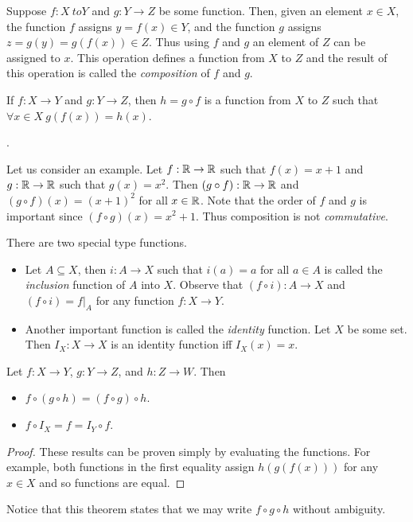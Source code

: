 Suppose $f : X \ to Y$ and $g : Y \to Z$ be some function. Then, given an
element $x \in X$, the function $f$ assigns $y = f(x) \in Y$, and the function
$g$ assigns $z = g(y) = g(f(x)) \in Z$. Thus using $f$ and $g$ an element of
$Z$ can be assigned to $x$. This operation defines a function from $X$ to $Z$
and the result of this operation is called the \textit{composition} of $f$ and
$g$.

\begin{definition}
  If $f : X \to Y$ and $g : Y \to Z$, then $h = g \circ f$ is a
  function from $X$ to $Z$ such that $\forall x \in X\ g(f(x)) = h(x)$.
\end{definition}.

Let us consider an example. Let $f : \mathbb{R} \to \mathbb{R}$ such that $f(x) = x + 1$ and
$g : \mathbb{R} \to \mathbb{R}$ such that $g(x) = x^2$. Then $(g \circ f) : \mathbb{R} \to \mathbb{R}$ and
$(g \circ f)(x) = (x + 1)^2$ for all $x \in \mathbb{R}$. Note that the order of $f$ and
$g$ is important since $(f \circ g)(x) = x^2 + 1$. Thus composition is not
\textit{commutative}.

There are two special type functions.
\begin{itemize}
  \item Let $A \subseteq X$, then $i : A \to X$ such that $i(a) = a$ for all
    $a \in A$ is called the \textit{inclusion} function of $A$ into $X$. Observe
    that $(f \circ i) : A \to X$ and $(f \circ i) = f|_A$
    for any function $f : X \to Y$.
  \item Another important function is called the \textit{identity} function.
    Let $X$ be some set. Then $I_X : X \to X$ is an identity function iff
    $I_X(x) = x$.
\end{itemize}

\begin{theorem}
  Let $f : X \to Y$, $g : Y \to Z$, and $h : Z \to W$. Then
  \begin{itemize}
    \item $f \circ (g \circ h) = (f \circ g) \circ h$.
    \item $f \circ I_X = f = I_Y \circ f$.
  \end{itemize}
\end{theorem}
\begin{proof}
  These results can be proven simply by evaluating the functions. For example,
  both functions in the first equality assign $h(g(f(x)))$ for any $x \in X$
  and so functions are equal.
\end{proof}
Notice that this theorem states that we may write $f \circ g \circ h$ without
ambiguity.

